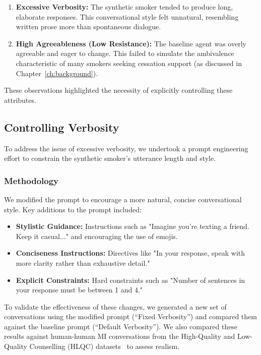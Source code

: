 \begin{enumerate}
    \item \textbf{Excessive Verbosity:} The synthetic smoker tended to produce long, elaborate responses. This conversational style felt unnatural, resembling written prose more than spontaneous dialogue.
    \item \textbf{High Agreeableness (Low Resistance):} The baseline agent was overly agreeable and eager to change. This failed to simulate the ambivalence characteristic of many smokers seeking cessation support (as discussed in Chapter~\ref{ch:background}).
\end{enumerate}

These observations highlighted the necessity of explicitly controlling these attributes.

\subsection{Controlling Verbosity}
\label{sec:synthetic-smoker-verbosity}

To address the issue of excessive verbosity, we undertook a prompt engineering effort to constrain the synthetic smoker's utterance length and style.

\subsubsection{Methodology}
We modified the prompt to encourage a more natural, concise conversational style. Key additions to the prompt included:

\begin{itemize}
    \item \textbf{Stylistic Guidance:} Instructions such as "Imagine you're texting a friend. Keep it casual..." and encouraging the use of emojis.
    \item \textbf{Conciseness Instructions:} Directives like "In your response, speak with more clarity rather than exhaustive detail."
    \item \textbf{Explicit Constraints:} Hard constraints such as "Number of sentences in your response must be between 1 and 4."
\end{itemize}

To validate the effectiveness of these changes, we generated a new set of conversations using the modified prompt (``Fixed Verbosity'') and compared them against the baseline prompt (``Default Verbosity''). We also compared these results against human-human MI conversations from the High-Quality and Low-Quality Counselling (HLQC) datasets~\citep{perez2019what} to assess realism.

